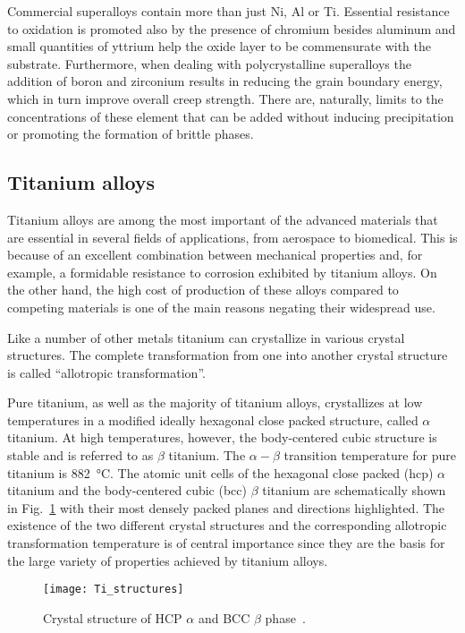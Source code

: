 Commercial superalloys contain more than just Ni, Al or Ti. Essential resistance to oxidation is promoted also by the presence of chromium besides aluminum and small quantities of yttrium help the oxide layer to be commensurate with the substrate. Furthermore, when dealing with polycrystalline superalloys the addition of boron and zirconium results in reducing the grain boundary energy, which in turn improve overall creep strength. There are, naturally, limits to the concentrations of these element that can be added without inducing precipitation or promoting the formation of brittle phases.


\subsection{Titanium alloys}
Titanium alloys are among the most important of the advanced materials that are essential in several fields of applications, from aerospace to biomedical. This is because of an excellent combination between mechanical properties and, for example, a formidable resistance to corrosion exhibited by titanium alloys. On the other hand, the high cost of production of these alloys compared to competing materials is one of the main reasons negating their widespread use.

Like a number of other metals titanium can crystallize in various crystal structures. The complete transformation from one into another crystal structure is called ``allotropic transformation''.

Pure titanium, as well as the majority of titanium alloys, crystallizes at low temperatures in a modified ideally hexagonal close packed structure, called $\alpha$ titanium. At high temperatures, however, the body-centered cubic structure is stable and is referred to as $\beta$ titanium. The $\alpha-\beta$ transition temperature for pure titanium is \SI{882}{\celsius}. The atomic unit cells of the hexagonal close packed (hcp) $\alpha$ titanium and the body-centered cubic (bcc) $\beta$ titanium are schematically shown in Fig.~\ref{fig:Ti_structures} with their most densely packed planes and directions highlighted.
The existence of the two different crystal structures and the corresponding allotropic transformation temperature is of central importance since they are the basis for the large variety of properties achieved by titanium alloys.
\begin{figure}[b]
    \centering
    \texttt{[image: Ti\_structures]}
    \caption{Crystal structure of HCP $\alpha$ and BCC $\beta$ phase~\cite{LeyensBOOK2003}.}
    \label{fig:Ti_structures}
\end{figure}


